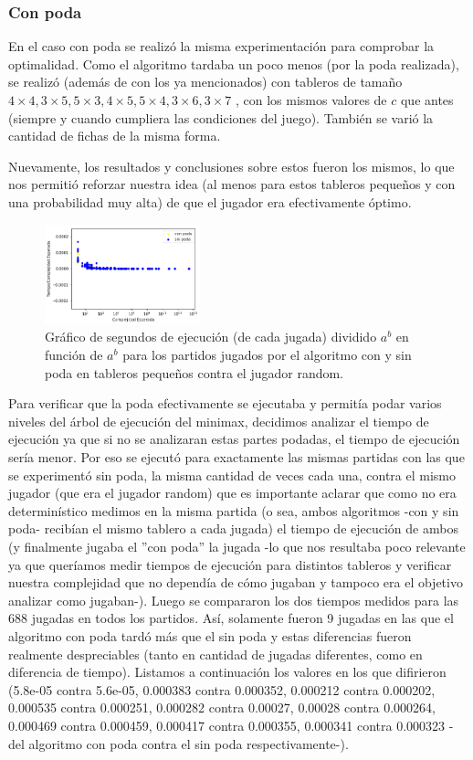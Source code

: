\documentclass[A4paper,oneside,fleqn,11pt]{article}
\theoremstyle{definition}
\begin{document}
\subsubsection{Con poda}
En el caso con poda se realizó la misma experimentación para comprobar la optimalidad. Como el algoritmo tardaba un poco menos (por la poda realizada), se realizó (además de con los ya mencionados) con tableros de tamaño $4\times4, 3\times5, 5\times3, 4\times5, 5\times4, 3\times6, 3\times7$ , con los mismos valores de $c$ que antes (siempre y cuando cumpliera las condiciones del juego). También se varió la cantidad de fichas de la misma forma.

Nuevamente, los resultados y conclusiones sobre estos fueron los mismos, lo que nos permitió reforzar nuestra idea (al menos para estos tableros pequeños y con una probabilidad muy alta) de que el jugador era efectivamente óptimo.



\begin{figure}
	\includegraphics[width=0.4\textwidth]{complejidad1.png}
	\caption{ Gráfico de segundos de ejecución (de cada jugada) dividido $a^b$ en función de $a^b$ para los partidos jugados por el algoritmo con y sin poda en tableros pequeños contra el jugador random.}
\end{figure}


Para verificar que la poda efectivamente se ejecutaba y permitía podar varios niveles del árbol de ejecución del minimax, decidimos analizar el tiempo de ejecución ya que si no se analizaran estas partes podadas, el tiempo de ejecución sería menor. Por eso se ejecutó para exactamente las mismas partidas con las que se experimentó sin poda, la misma cantidad de veces cada una, contra el mismo jugador (que era el jugador random) que es importante aclarar que como no era determinístico medimos en la misma partida (o sea, ambos algoritmos -con y sin poda- recibían el mismo tablero a cada jugada) el tiempo de ejecución de ambos (y finalmente jugaba el ''con poda'' la jugada -lo que nos resultaba poco relevante ya que queríamos medir tiempos de ejecución para distintos tableros y verificar nuestra complejidad que no dependía de cómo jugaban y tampoco era el objetivo analizar como jugaban-). Luego se compararon los dos tiempos medidos para las 688 jugadas en todos los partidos. Así, solamente fueron 9 jugadas en las que el algoritmo con poda tardó más que el sin poda y estas diferencias fueron realmente despreciables (tanto en cantidad de jugadas diferentes, como en diferencia de tiempo). Listamos a continuación los valores en los que difirieron (5.8e-05 contra 5.6e-05, 0.000383 contra 0.000352, 0.000212 contra 0.000202, 0.000535 contra 0.000251, 0.000282 contra 0.00027, 0.00028 contra 0.000264, 0.000469 contra 0.000459, 0.000417 contra 0.000355, 0.000341 contra 0.000323 -del algoritmo con poda contra el sin poda respectivamente-).
\end{document}
